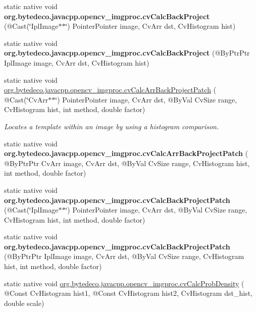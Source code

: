 \begin{DoxyCompactItemize}
static native void {\bfseries org.\+bytedeco.\+javacpp.\+opencv\+\_\+imgproc.\+cv\+Calc\+Back\+Project} (@Cast(\char`\"{}Ipl\+Image$\ast$$\ast$\char`\"{}) Pointer\+Pointer image, Cv\+Arr dst, Cv\+Histogram hist)
\item 
\mbox{\label{group__imgproc__c_ga1f12a1ca4525bb9a42cb2a54890ccce4}} 
static native void {\bfseries org.\+bytedeco.\+javacpp.\+opencv\+\_\+imgproc.\+cv\+Calc\+Back\+Project} (@By\+Ptr\+Ptr Ipl\+Image image, Cv\+Arr dst, Cv\+Histogram hist)
\item 
static native void \hyperlink{group__imgproc__c_ga31746133be041f7be11b46e7df88363e}{org.\+bytedeco.\+javacpp.\+opencv\+\_\+imgproc.\+cv\+Calc\+Arr\+Back\+Project\+Patch} ( @Cast(\char`\"{}Cv\+Arr$\ast$$\ast$\char`\"{}) Pointer\+Pointer image, Cv\+Arr dst, @By\+Val Cv\+Size range, Cv\+Histogram hist, int method, double factor)
\begin{DoxyCompactList}\small\item\em Locates a template within an image by using a histogram comparison. \end{DoxyCompactList}\item 
\mbox{\label{group__imgproc__c_gafc02a003e97f90e3a479f3934a932207}} 
static native void {\bfseries org.\+bytedeco.\+javacpp.\+opencv\+\_\+imgproc.\+cv\+Calc\+Arr\+Back\+Project\+Patch} ( @By\+Ptr\+Ptr Cv\+Arr image, Cv\+Arr dst, @By\+Val Cv\+Size range, Cv\+Histogram hist, int method, double factor)
\item 
\mbox{\label{group__imgproc__c_ga954fc9a45e60f2bedfa7954047b77576}} 
static native void {\bfseries org.\+bytedeco.\+javacpp.\+opencv\+\_\+imgproc.\+cv\+Calc\+Back\+Project\+Patch} (@Cast(\char`\"{}Ipl\+Image$\ast$$\ast$\char`\"{}) Pointer\+Pointer image, Cv\+Arr dst, @By\+Val Cv\+Size range, Cv\+Histogram hist, int method, double factor)
\item 
\mbox{\label{group__imgproc__c_gaa43deb0be8942f8c0659057f42800011}} 
static native void {\bfseries org.\+bytedeco.\+javacpp.\+opencv\+\_\+imgproc.\+cv\+Calc\+Back\+Project\+Patch} (@By\+Ptr\+Ptr Ipl\+Image image, Cv\+Arr dst, @By\+Val Cv\+Size range, Cv\+Histogram hist, int method, double factor)
\item 
static native void \hyperlink{group__imgproc__c_ga4a08e20f0a1dc639f2d1052b77f9a024}{org.\+bytedeco.\+javacpp.\+opencv\+\_\+imgproc.\+cv\+Calc\+Prob\+Density} ( @Const Cv\+Histogram hist1, @Const Cv\+Histogram hist2, Cv\+Histogram dst\+\_\+hist, double scale)
$$
\end{DoxyCompactItemize}
